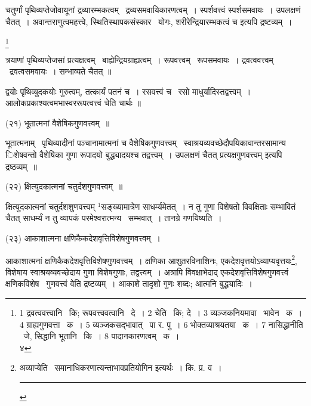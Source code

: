 \documentclass[11pt, openany]{book}
\newcommand\blfootnote[1]{%
 \begingroup
 \renewcommand\thefootnote{}\footnote{#1}%
 \addtocounter{footnote}{-1}%
 \endgroup
}
\begin{document}
{\knu चतुर्णां} पृथिव्यप्तेजोवायूनां {\knu द्रव्यारम्भकत्वम्} \textendash\ द्रव्यसमवायिकारणत्वम्~। स्पर्शवत्त्वं स्पर्शसमवायः~। उपलक्षणं चैतत्~। अवान्तराणुत्वमहत्त्वे, स्थितिस्थापकसंस्कार \textendash\ योगः, शरीरेन्द्रियारम्भकत्वं च इत्यपि द्रष्टव्यम्~।

\blfootnote{1 द्रवत्ववत्त्वानि  \textendash\ कि; रूपवत्त्ववत्वानि  \textendash\ दे~। 2 चेति  \textendash\ कि; दे~। 3 व्यञ्जकनियमावा  \textendash\ भावेन  \textendash\ क~। 4 ग्राह्यगुणवत्ता  \textendash\ क~। 5 व्यञ्जकसद्भावात्  \textendash\ पा र. पु~। 6 भोक्तव्याश्रयतया  \textendash\ क~। 7 नासिद्धानीति  \textendash\ जे, सिद्धानि भूतानि  \textendash\ कि~। 8 पादानकारणत्वम्  \textendash\ क~।\\ ४}

\newpage
{\knu त्रयाणां} पृथिव्यप्तेजसां {\knu प्रत्यक्षत्वम्} \textendash\ बाह्येन्द्रियग्राह्यत्वम्~। {\knu रूपवत्त्वम्} \textendash\ रूपसमवायः~। {\knu द्रवत्ववत्त्वम्} \textendash\ द्रवत्वसमवायः~। सम्भाव्यते चैतत् ॥ 

{\knu द्वयोः} पृथिव्युदकयोः {\knu गुरुत्वम्}, तत्कार्यं पतनं च~। {\knu रसवत्त्वं च} \textendash\ रसो माधुर्यादिस्तद्वत्त्वम्~। आलोकप्रकाश्यत्वमभास्वररूपत्वत्त्वं चेति चार्थः ॥

{\knu (२१) भूतात्मनां वैशेषिकगुणवत्त्वम्~॥}

{\knu भूतात्मनाम्} \textendash\ पृथिव्यादीनां पञ्चानामात्मनां च {\knu वैशेषिकगुणवत्त्वम्} \textendash\ स्वाश्रयव्यवच्छेदौपयिकावान्तरसामान्य िशेषवन्तो वैशेषिका गुणा रूपादयो बुद्ध्यादयश्च तद्वत्त्वम्~। उपलक्षणं चैतत् प्रत्यक्षगुणवत्त्वम् इत्यपि द्रष्ठव्यम्~॥

{\knu (२२) क्षित्युदकात्मनां चतुर्दशगुणवत्त्वम्~॥}

{\knu क्षित्युदकात्मनां चतुर्दशशुणवत्त्वम्} ${}^1$सङ्ख्यामात्रेण साधर्म्यमेतत्~। न तु गुणा विशेषतो विवक्षिताः सम्भावितं चैतत् साधर्म्यं न तु व्यापकं परमेश्वरात्मन्य \textendash\ सम्भवात्~। तानग्रे गणयिष्यति~।

{\knu (२३) आकाशात्मना क्षणिकैकदेशवृत्तिविशेषगुणवत्त्वम्~।}

{\knu आकाशात्मनां क्षणिकैकदेशवृत्तिविशेषणुणवत्त्वम्~।} क्षणिका आशुतरविनाशिनः, एकदेशवृत्तयोऽव्याप्यवृत्तयः\renewcommand{\thefootnote}{१}\footnote{अव्याप्येति \textendash\ समानाधिकरणात्यन्ताभावप्रतियोगिन इत्यर्थः~। कि. प्र. व~।\\ \rule{0.4\linewidth}{0.5pt}}, विशेषाय स्वाश्रयव्यवच्छेदाय गुणा विशेषगुणाः, तद्वत्त्वम्~। अत्रापि विवक्षाभेदाद् एकदेशवृत्तिविशेषगुणवत्त्वं क्षणिकविशेष \textendash\ गुणवत्त्वं वेति द्रष्टव्यम्~। आकाशे तादृशो गुणः शब्दः; आत्मनि बुद्ध्यादिः~। 
\end{document}
